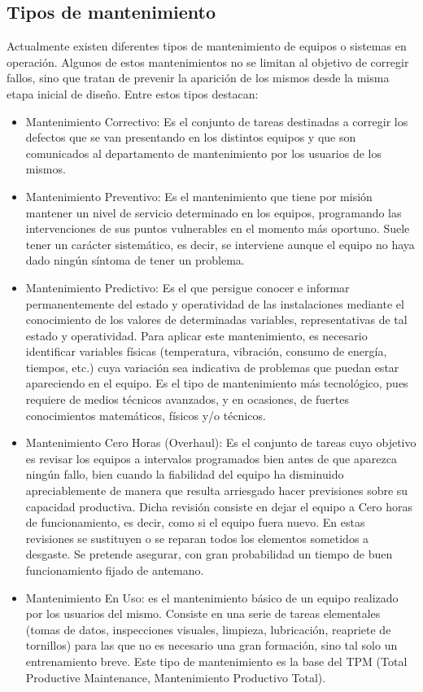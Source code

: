 \documentclass[runningheads,a4paper,12pt]{report}
\begin{document}
\subsection{Tipos de mantenimiento}

Actualmente existen diferentes tipos de mantenimiento de equipos o sistemas en operación. Algunos de estos mantenimientos no se limitan al objetivo de corregir fallos, sino que tratan de prevenir la aparición de los mismos desde la misma etapa inicial de diseño. Entre estos tipos destacan: 

\begin{itemize}
	\item Mantenimiento Correctivo: Es el conjunto de tareas destinadas a corregir los defectos que se van presentando en los distintos equipos y que son comunicados al departamento de mantenimiento por los usuarios de los mismos.  \\
	\item Mantenimiento Preventivo: Es el mantenimiento que tiene por misión mantener un nivel de servicio determinado en los equipos, programando las intervenciones de sus puntos vulnerables en el momento más oportuno. Suele tener un carácter sistemático, es decir, se interviene aunque el equipo no haya dado ningún síntoma de tener un problema.\\
	\item Mantenimiento Predictivo: Es el que persigue conocer e informar permanentemente del estado y operatividad de las instalaciones mediante el conocimiento de los valores de determinadas variables, representativas de tal estado y operatividad. Para aplicar este mantenimiento, es necesario identificar variables físicas (temperatura, vibración, consumo de energía, tiempos, etc.) cuya variación sea indicativa de problemas que puedan estar apareciendo en el equipo. Es el tipo de mantenimiento más tecnológico, pues requiere de medios técnicos avanzados, y en ocasiones, de fuertes conocimientos matemáticos, físicos y/o técnicos. \\
	\item Mantenimiento Cero Horas (Overhaul): Es el conjunto de tareas cuyo objetivo es revisar los equipos a intervalos programados bien antes de que aparezca ningún fallo, bien cuando la fiabilidad del equipo ha disminuido apreciablemente de manera que resulta arriesgado hacer previsiones sobre su capacidad productiva. Dicha revisión consiste en dejar el equipo a Cero horas de funcionamiento, es decir, como si el equipo fuera nuevo. En estas revisiones se sustituyen o se reparan todos los elementos sometidos a desgaste. Se pretende asegurar, con gran probabilidad un tiempo de buen funcionamiento fijado de antemano.  \\
	\item Mantenimiento En Uso: es el mantenimiento básico de un equipo realizado por los usuarios del mismo. Consiste en una serie de tareas elementales (tomas de datos, inspecciones visuales, limpieza, lubricación, reapriete de tornillos) para las que no es necesario una gran formación, sino tal solo un entrenamiento breve. Este tipo de mantenimiento es la base del TPM (Total Productive Maintenance, Mantenimiento Productivo Total).  \\
\end{itemize}
\end{document}
